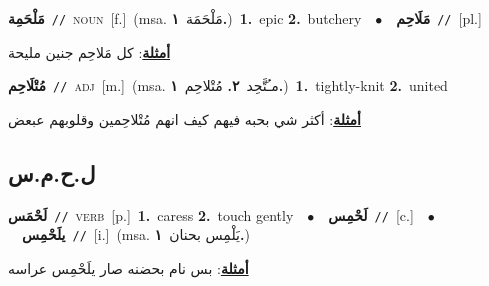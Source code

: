 \documentclass[10pt,a4paper,twoside]{article} %
\begin{document}
\begin{multicols}{2}
{\setlength\topsep{0pt}\textbf{\foreignlanguage{arabic}{مَلْحَمِة}}\ {\color{gray}\texttt{//}\color{black}}\ \textsc{noun}\ [f.]\ \color{gray}(msa. \foreignlanguage{arabic}{مَلْحَمَة}~\foreignlanguage{arabic}{\textbf{١.}})\color{black}\ \textbf{1.}~epic  \textbf{2.}~butchery\ \ $\bullet$\ \ \setlength\topsep{0pt}\textbf{\foreignlanguage{arabic}{مَلَاحِم}}\ {\color{gray}\texttt{//}\color{black}}\ [pl.]\  \begin{flushright}\color{gray}\foreignlanguage{arabic}{\textbf{\underline{\foreignlanguage{arabic}{أمثلة}}}: كل مَلاحِم جنين مليحة}\end{flushright}\color{black}} \vspace{2mm}

{\setlength\topsep{0pt}\textbf{\foreignlanguage{arabic}{مُتْلَاحِم}}\ {\color{gray}\texttt{//}\color{black}}\ \textsc{adj}\ [m.]\ \color{gray}(msa. \foreignlanguage{arabic}{مـُتَّحِد}~\foreignlanguage{arabic}{\textbf{٢.}}  \foreignlanguage{arabic}{مُتْلاحِم}~\foreignlanguage{arabic}{\textbf{١.}})\color{black}\ \textbf{1.}~tightly-knit  \textbf{2.}~united\  \begin{flushright}\color{gray}\foreignlanguage{arabic}{\textbf{\underline{\foreignlanguage{arabic}{أمثلة}}}: أكثر شي بحبه فيهم كيف انهم مُتْلاحِمين وقلوبهم عبعض}\end{flushright}\color{black}} \vspace{2mm}

\vspace{-3mm}
\subsection*{\color{blue}\foreignlanguage{arabic}{ل.ح.م.س}\color{blue}{}} 

{\setlength\topsep{0pt}\textbf{\foreignlanguage{arabic}{لَحْمَس}}\ {\color{gray}\texttt{//}\color{black}}\ \textsc{verb}\ [p.]\ \textbf{1.}~caress  \textbf{2.}~touch gently\ \ $\bullet$\ \ \setlength\topsep{0pt}\textbf{\foreignlanguage{arabic}{لَحْمِس}}\ {\color{gray}\texttt{//}\color{black}}\ [c.]\ \ $\bullet$\ \ \setlength\topsep{0pt}\textbf{\foreignlanguage{arabic}{يلَحْمِس}}\ {\color{gray}\texttt{//}\color{black}}\ [i.]\ \color{gray}(msa. \foreignlanguage{arabic}{يَلْمِس بحنان}~\foreignlanguage{arabic}{\textbf{١.}})\color{black}\  \begin{flushright}\color{gray}\foreignlanguage{arabic}{\textbf{\underline{\foreignlanguage{arabic}{أمثلة}}}: بس نام بحضنه صار يلَحْمِس عراسه}\end{flushright}\color{black}} \vspace{2mm}


\end{multicols}
\end{document}
